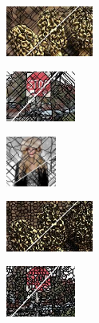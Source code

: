 \begin{figure}
\begin{subfigure}[b]{0.10\textwidth}
	\end{subfigure}\\
	\begin{subfigure}[b]{0.02\textwidth}
	\end{subfigure}
	\begin{subfigure}[b]{0.16\textwidth}
		\includegraphics[height=1.65cm]{pictures/bsds500/pf/cropped/pf_208078_contours}
	\end{subfigure}
	\begin{subfigure}[b]{0.129\textwidth}
		\includegraphics[height=1.65cm]{pictures/sbd/pf/cropped/pf_6000067_contours}
	\end{subfigure}
	\begin{subfigure}[b]{0.10\textwidth}
		\includegraphics[height=1.65cm]{pictures/fash/pf/cropped/pf_132_contours}
	\end{subfigure}
	\begin{subfigure}[b]{0.02\textwidth}
	\end{subfigure}
	\begin{subfigure}[b]{0.16\textwidth}
		\includegraphics[height=1.65cm]{pictures/bsds500/tp/cropped/tp_208078_contours}
	\end{subfigure}
	\begin{subfigure}[b]{0.129\textwidth}
		\includegraphics[height=1.65cm]{pictures/sbd/tp/cropped/tp_6000067_contours}

\end{subfigure}
\end{figure}
